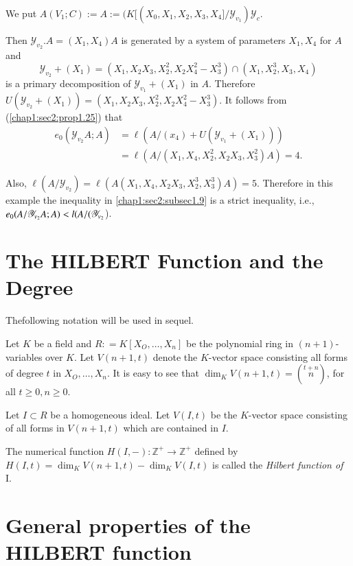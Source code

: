 We put $A(V_1;C):=A:=(K[(X_0, X_1, X_2, X_3,
  X_4]/\mathscr{Y}_{v_1})\mathscr{Y}_c$.  

Then $\mathscr{Y}_{v_2}. A=(X_1, X_4)A$ is generated by a system of
parameters $X_1, X_4$ for $A$ and  
$$
\mathscr{Y}_{v_2}+(X_1)=(X_1, X_2 X_3, X^2_2, X_2 X^2_4-X^3_3)\cap(X_1,
X^3_2, X_3, X_4) 
$$
is a primary decomposition of $\mathscr{Y}_{v_1}+(X_1)$ in
$A$. Therefore $U(\mathscr{Y}_{v_2}+(X_1))=(X_1, X_2 X_3, X^2_2, X_2
X^2_4-X^3_3)$. It follows from (\ref{chap1:sec2:prop1.25}) that 
\begin{align*}
  e_0(\mathscr{Y}_{v_2} A;A) & =\ell (A/(x_4) + U(\mathscr{Y}_{v_1}+(X_1)))\\
  & = \ell (A/(X_1, X_4, X^2_2, X_2 X_3, X^2_3)A) = 4. 
\end{align*}

Also, $\ell(A/\mathscr{Y}_{v_2})=\ell(A(X_1, X_4, X_2X_3, X^3_2,
X^3_3)A)=5$. Therefore in this example the inequality in
\ref{chap1:sec2:subsec1.9} is a
strict inequality, i.e., $e_0(A/\mathscr{Y}_{v_2}A;A)\break <
l(A/(\mathscr{Y}_{v_2}$). 

\section{The HILBERT Function and the Degree}\label{chap1:sec3}

\setcounter{notation}{26}
\begin{notation}\label{chap1:sec3:not1.27}
  The\pageoriginale following notation will be used in sequel.
\end{notation}

Let $K$ be a field and $ R: = K[ X_O, \ldots, X_n]$ be the polynomial
ring in $(n+1)$-variables over $K$. Let $V(n+1, t)$ denote the
$K$-vector space consisting all forms of degree $t$ in $ X_O, \ldots,
X_n$. It is easy to see that $\dim_K V(n+1, t)= (\overset{t+n}n)$, for
all $t \geq 0, n \geq 0$. 

Let $I \subset R$ be a homogeneous ideal. Let $V(I,t)$ be the
$K$-vector space consisting of all forms in $V(n+1, t)$ which are
contained in $I$.  

\setcounter{definition}{27}
\begin{definition}\label{chap1:sec3:def1.28}
  The numerical function $H(I,-): \mathbb{Z}^+ \to \mathbb{Z}^+$ defined
  by $H(I, t) = \dim_K V(n+ 1,t) - \dim_K V(I,t)$ is called the
  \textit{Hilbert function of} I. 
\end{definition}

\section*{General properties of the HILBERT function}

